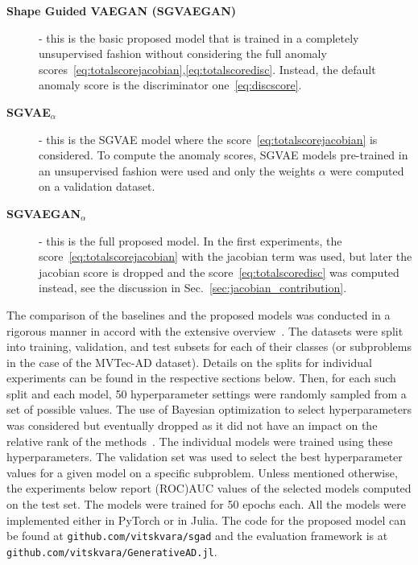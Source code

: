 \begin{description}
    \item[\textbf{Shape Guided VAEGAN (SGVAEGAN)}] - this is the basic proposed model that is trained in a completely unsupervised fashion without considering the full anomaly scores~\eqref{eq:totalscorejacobian},\eqref{eq:totalscoredisc}. Instead, the default anomaly score is the discriminator one~\eqref{eq:discscore}.
    \item[\textbf{SGVAE$_{\alpha}$}] - this is the SGVAE model where the score~\eqref{eq:totalscorejacobian} is considered. To compute the anomaly scores,  SGVAE models pre-trained in an unsupervised fashion were used and only the weights $\alpha$ were computed on a validation dataset.
    \item[\textbf{SGVAEGAN$_{\alpha}$}] - this is the full proposed model. In the first experiments, the score~\eqref{eq:totalscorejacobian} with the jacobian term was used, but later the jacobian score is dropped and the score~\eqref{eq:totalscoredisc} was computed instead, see the discussion in Sec.~\ref{sec:jacobian_contribution}.
\end{description}

The comparison of the baselines and the proposed models was conducted in a rigorous manner in accord with the extensive overview~\cite{vskvara2021comparison}. The datasets were split into training, validation, and test subsets for each of their classes (or subproblems in the case of the MVTec-AD dataset). Details on the splits for individual experiments can be found in the respective sections below. Then, for each such split and each model, 50 hyperparameter settings were randomly sampled from a set of possible values. The use of Bayesian optimization to select hyperparameters was considered but eventually dropped as it did not have an impact on the relative rank of the methods~\cite{vskvara2021comparison}. The individual models were trained using these hyperparameters. The validation set was used to select the best hyperparameter values for a given model on a specific subproblem. Unless mentioned otherwise, the experiments below report (ROC)AUC values of the selected models computed on the test set. The models were trained for 50 epochs each. All the models were implemented either in PyTorch or in Julia. The code for the proposed model can be found at \texttt{github.com/vitskvara/sgad} and the evaluation framework is at \texttt{github.com/vitskvara/GenerativeAD.jl}. 

